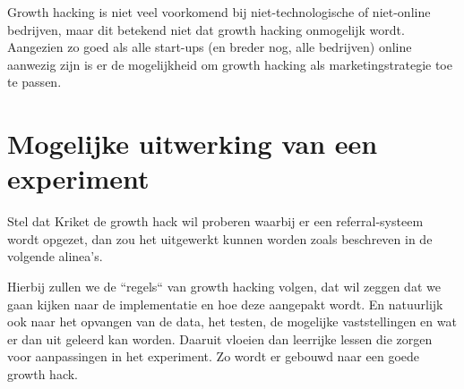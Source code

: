 Growth hacking is niet veel voorkomend bij niet-technologische of niet-online bedrijven, maar dit betekend niet dat growth hacking onmogelijk wordt. Aangezien zo goed als alle start-ups (en breder nog, alle bedrijven) online aanwezig zijn is er de mogelijkheid om growth hacking als marketingstrategie toe te passen. 

\section{Mogelijke uitwerking van een experiment}
\label{sec:mogelijke-uitwerking-van-een-experiment}
Stel dat Kriket de growth hack wil proberen waarbij er een referral-systeem wordt opgezet, dan zou het uitgewerkt kunnen worden zoals beschreven in de volgende alinea's.

Hierbij zullen we de ``regels`` van growth hacking volgen, dat wil zeggen dat we gaan kijken naar de implementatie en hoe deze aangepakt wordt. En natuurlijk ook naar het opvangen van de data, het testen, de mogelijke vaststellingen en wat er dan uit geleerd kan worden. Daaruit vloeien dan leerrijke lessen die zorgen voor aanpassingen in het experiment. Zo wordt er gebouwd naar een goede growth hack.



 
